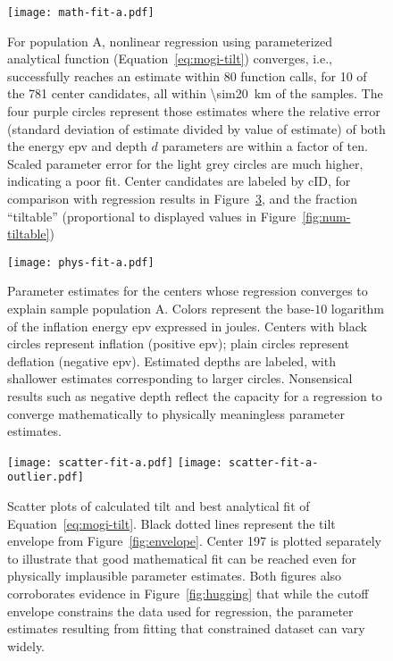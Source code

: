 \begin{figure}
    \texttt{[image: math-fit-a.pdf]}%
    \caption[Population A: goodness of fit]{For population A, nonlinear regression using parameterized analytical function (Equation~\eqref{eq:mogi-tilt}) converges, i.e., successfully reaches an estimate within 80 function calls, for 10 of the 781 center candidates, all within \qty{\sim20}{\km} of the samples. The four purple circles represent those estimates where the relative error (standard deviation of estimate divided by value of estimate) of both the energy \acs{epv} and depth $d$ parameters are within a factor of ten. Scaled parameter error for the light grey circles are much higher, indicating a poor fit. Center candidates are labeled by cID, for comparison with regression results in Figure~\ref{fig:scatter-fit-a}, and the fraction ``tiltable'' (proportional to displayed values in Figure~\ref{fig:num-tiltable})}%
    \label{fig:math-fit-a}
\end{figure}

\begin{figure}
    \texttt{[image: phys-fit-a.pdf]}%
    \caption[Population A: parameter estimates]{Parameter estimates for the centers whose regression converges to explain sample population A. Colors represent the base-$10$ logarithm of the inflation energy \acs{epv} expressed in joules. Centers with black circles represent inflation (positive \acs{epv}); plain circles represent deflation (negative \acs{epv}). Estimated depths are labeled, with shallower estimates corresponding to larger circles. Nonsensical results such as negative depth reflect the capacity for a regression to converge mathematically to physically meaningless parameter estimates.}%
    \label{fig:phys-fit-a}
\end{figure}

\begin{figure}
    \texttt{[image: scatter-fit-a.pdf]}
    \texttt{[image: scatter-fit-a-outlier.pdf]}
    \caption[Population A: scatter Plots \& analytical fit]{Scatter plots of calculated tilt and best analytical fit of Equation~\eqref{eq:mogi-tilt}. Black dotted lines represent the tilt envelope from Figure~\ref{fig:envelope}. Center 197 is plotted separately to illustrate that good mathematical fit can be reached even for physically implausible parameter estimates. Both figures also corroborates evidence in Figure~\ref{fig:hugging} that while the cutoff envelope constrains the data used for regression, the parameter estimates resulting from fitting that constrained dataset can vary widely.}%
    \label{fig:scatter-fit-a}
\end{figure}

